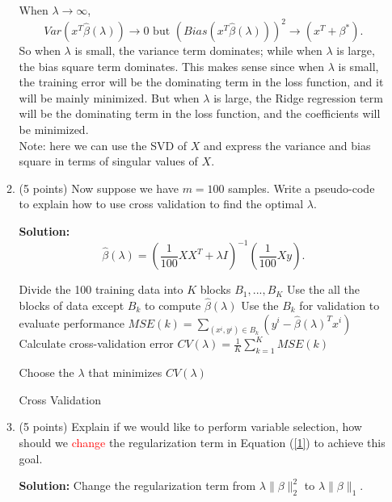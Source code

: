 \documentclass[twoside,10pt]{article}
\begin{document}
\begin{enumerate}
\begin{enumerate}
\begin{tcolorbox}
When $\lambda \rightarrow \infty$, $$Var(x^T \hat{\beta}(\lambda)) \rightarrow 0 \text{ but } \left(Bias(x^T \hat{\beta}(\lambda))\right)^2 \rightarrow (x^T + \beta^*).$$
So when $\lambda$ is small, the variance term dominates; while when $\lambda$ is large, the bias square term dominates. This makes sense since when $\lambda$ is small, the training error will be the dominating term in the loss function, and it will be mainly minimized. But when $\lambda$ is large, the Ridge regression term will be the dominating term in  the loss function, and the coefficients will be minimized. \\

Note: here we can use the SVD of $X$ and express the variance and bias square in terms of singular values of $X$. 
\end{tcolorbox}

\item (5 points) Now suppose we have $m= 100$ samples. Write a pseudo-code to explain how to use cross validation to find the optimal $\lambda$.
\begin{tcolorbox}
\textbf{Solution:}
$$\hat{\beta}(\lambda) = \left( \frac 1 {100} XX^T + \lambda I \right)^{-1} \left(\frac 1 {100} Xy\right).$$
  \begin{algorithm}[H]
  \begin{algorithmic}
    \STATE Divide the 100 training data into $K$ blocks $B_1, ..., B_K$
                 \STATE Use the all the blocks of data except $B_k$ to compute $\hat{\beta}(\lambda)$
                 \STATE Use the $B_k$ for validation to evaluate performance $MSE(k)=\sum_{(x^i, y^i)\in B_k} (y^i - \hat{\beta}(\lambda)^Tx^i)$                 
                 \ENDFOR
    \STATE Calculate cross-validation error $CV(\lambda) = \frac 1 K \sum_{k=1}^K MSE(k)$
    
    \ENDFOR
    \STATE Choose the $\lambda$ that minimizes $CV(\lambda)$
    \end{algorithmic}
    \caption{Cross Validation}
  \end{algorithm}

\end{tcolorbox}

\item (5 points) Explain if we would like to perform variable selection, how should we \textcolor{red}{change} the regularization term in Equation (\ref{1}) to achieve this goal. 
\begin{tcolorbox}
\textbf{Solution:} Change the regularization term from $\lambda\|\beta\|_2^2$ to $\lambda\|\beta\|_1.$
\end{tcolorbox}


\end{enumerate}
\end{enumerate}
\end{document}
